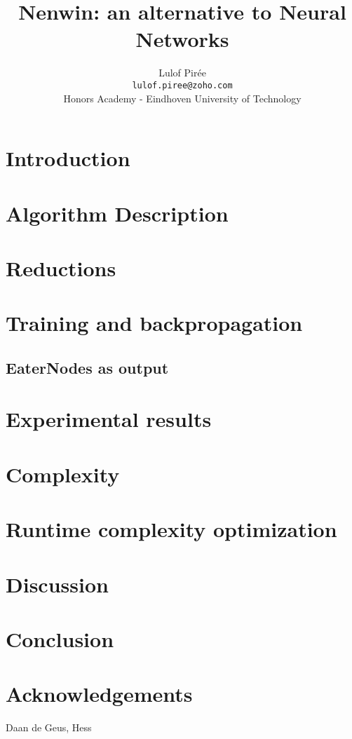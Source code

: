 \documentclass{scrartcl}
\title{Nenwin: an alternative to Neural Networks}
\author{Lulof Pirée\\\footnotesize\texttt{lulof.piree@zoho.com}\\\small{Honors Academy - Eindhoven University of Technology}\\}
\newcommand{\hl}[1]{{\color{red}#1}} %
\begin{document}
    \maketitle
    
    \newpage
    
    \tableofcontents
    \newpage
    
    \section{Introduction}
    
    
    \section{Algorithm Description}
        
    
    \section{Reductions}
    
    
    \section{Training and backpropagation}
    
    
    \subsection{EaterNodes as output}
    
    
    \section{Experimental results}
    
    
    \section{Complexity}
    
    
    \section{Runtime complexity optimization}
    

    \section{Discussion}
    
    
    \section{Conclusion}
    
    
    \section{Acknowledgements}
    \hl{Daan de Geus, Hess}
    \printbibliography[
    heading=bibintoc,
    title={References}
    ]
    
    \appendix
    
    
\end{document}
